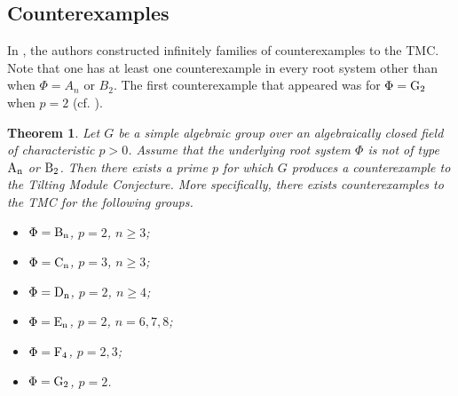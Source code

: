 \documentclass[twoside,11pt,reqno]{amsart}
\newcommand{\0}{\bar 0}
\newcommand{\1}{\bar 1}
\newtheorem{theorem}{Theorem}[subsection]
\theoremstyle{definition}
\numberwithin{equation}{subsection}
\begin{document}
\subsection{Counterexamples} \label{SS:counterexamples} In \cite{BNPS22b}, the authors constructed infinitely families of counterexamples to the TMC. Note that one has at least one counterexample 
in every root system other than when $\Phi=A_{n}$ or $B_{2}$. The first counterexample that appeared was for $\Phi=\rm{G}_{2}$ when $p=2$ (cf. \cite{BNPS20}). 
﻿
\begin{theorem}\label{T:counter} Let $G$ be a simple algebraic group over an algebraically closed field of characteristic $p>0$. Assume that the underlying root system $\Phi$ is not of type 
$\rm{A}_{n}$ or $\rm{B}_{2}$. Then there exists a prime $p$ for which $G$ produces a counterexample to the Tilting Module Conjecture. More specifically, 
there exists counterexamples to the TMC for the following groups. 
\begin{itemize} 
\item $\Phi=\rm{B}_{n}$, $p=2$, $n\geq 3$;
\item $\Phi=\rm{C}_{n}$, $p=3$, $n\geq 3$;
\item $\Phi=\rm{D}_{n}$, $p=2$, $n\geq 4$;
\item $\Phi=\rm{E}_{n}$, $p=2$, $n=6,7,8$;
\item $\Phi=\rm{F}_{4}$, $p=2,3$; 
\item $\Phi=\rm{G}_{2}$, $p=2$. 
\end{itemize} 
\end{theorem} 
﻿
﻿
\end{document}
